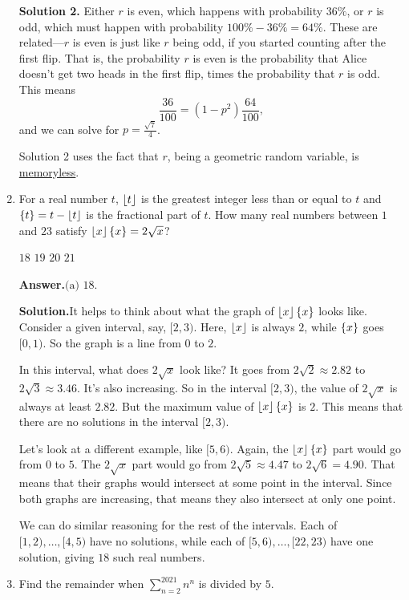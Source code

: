 \documentclass[11pt,paper=letter]{scrartcl}
\newcommand{\ansb}[2]{{\sffamily \bfseries Answer.}\;\(\boxed{\text{(#1) #2}}\).}
\newcommand{\sol}{{\sffamily \bfseries Solution.}\;}
\newcommand{\soln}[1]{{\sffamily \bfseries Solution #1.}\;}
\newenvironment{rem}%
{\noindent \ignorespaces \small \sffamily \sansmath {\bfseries Remark.}}%
{\ignorespacesafterend}
\begin{document}
\begin{enumerate}[align=left,leftmargin=*]
\soln2 Either $r$ is even, which happens with probability $36\%$, or $r$ is odd, which must happen with probability $100\% - 36\% = 64\%$. These are related---$r$ is even is just like $r$ being odd, if you started counting after the first flip. That is, the probability $r$ is even is the probability that Alice doesn't get two heads in the first flip, times the probability that $r$ is odd. This means \[
  \frac{36}{100} = (1 - p^2)\frac{64}{100},
\]
and we can solve for $p = \frac{\sqrt7}{4}$.

\begin{rem}
Solution 2 uses the fact that $r$, being a geometric random variable, is \href{https://en.wikipedia.org/wiki/Memorylessness#Discrete_memorylessness}{memoryless}.
\end{rem}

\item For a real number $t$, $\left\lfloor t \right\rfloor$ is the greatest integer less than or equal to $t$ and $\left\{ t \right\} = t - \left\lfloor t \right\rfloor$ is the fractional part of $t$. How many real numbers between $1$ and $23$ satisfy $\left\lfloor x \right\rfloor\left\{ x \right\} = 2\sqrt{x}$?

\fourch
{$18$}
{$19$}
{$20$}
{$21$}

\ansb{a}{$18$}

\sol It helps to think about what the graph of $\left\lfloor x \right\rfloor\left\{ x \right\}$ looks like. Consider a given interval, say, $[2, 3)$. Here, $\left\lfloor x \right\rfloor$ is always $2$, while $\left\{ x \right\}$ goes $[0, 1)$. So the graph is a line from $0$ to $2$.

In this interval, what does $2\sqrt{x}$ look like? It goes from $2\sqrt{2} \approx 2.82$ to $2\sqrt{3} \approx 3.46$. It's also increasing. So in the interval $[2, 3)$, the value of $2\sqrt{x}$ is always at least $2.82$. But the maximum value of $\left\lfloor x \right\rfloor\left\{ x \right\}$ is $2$. This means that there are no solutions in the interval $[2, 3)$.

Let's look at a different example, like $[5, 6)$. Again, the $\left\lfloor x \right\rfloor\left\{ x \right\}$ part would go from $0$ to $5$. The $2\sqrt{x}$ part would go from $2\sqrt{5} \approx 4.47$ to $2\sqrt{6} = 4.90$. That means that their graphs would intersect at some point in the interval. Since both graphs are increasing, that means they also intersect at only one point.

We can do similar reasoning for the rest of the intervals. Each of $[1, 2), \ldots, [4, 5)$ have no solutions, while each of $[5, 6), \ldots, [22, 23)$ have one solution, giving $18$ such real numbers.

\item Find the remainder when $\displaystyle \sum_{n=2}^{2021} n^n$ is divided by $5$.


\end{enumerate}
\end{document}
